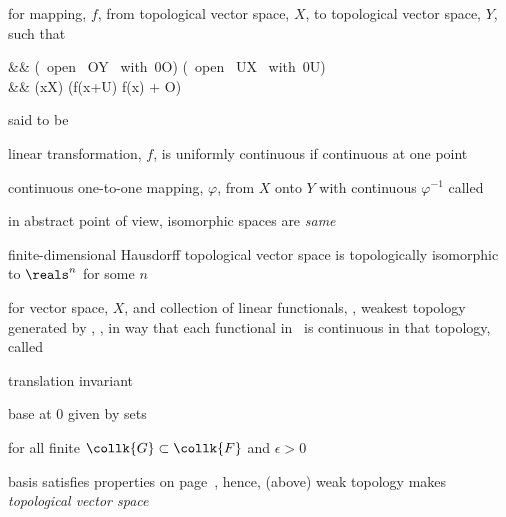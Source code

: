 \documentclass[17pt,landscape]{foils}
\newcommand\collF{\collk{F}}
\begin{document}
{{	\vitem for mapping, $f$,
		from topological vector space, $X$,
		to topological vector space, $Y$,
		such that

		\begin{eqna}
			&&
			(\forall \mbox{ open } O\subset Y \mbox{ with }0\in O)
			(\exists \mbox{ open } U\subset X \mbox{ with }0\in U)
			\\
			&&
			(\forall x\in X)
			(f(x+U) \subset f(x) + O)
		\end{eqna}

		said to be 

	\vitem linear transformation, $f$, is uniformly continuous
		if continuous at one point

	\vitem continuous one-to-one mapping, $\varphi$, from $X$ onto $Y$ with continuous $\varphi^{-1}$
		called 
	\bit
		\item in abstract point of view, isomorphic spaces are \emph{same}
	\eit

	\vitem {}
		finite-dimensional Hausdorff topological vector space
		is topologically isomorphic
		to $\reals^n$ for some $n$%
\eit


%

\bit
	\item for vector space, $X$, and collection of linear functionals, \collF,
		weakest topology generated by \collF,
		\ie, in way that each functional in \collF\ is continuous in that topology,
		called  \collF\
	\bit
		\item translation invariant
		\item base at $0$ given by sets

		\begin{eqn}
		\end{eqn}

		for all finite $\collk{G}\subset\collF$ and $\epsilon>0$

		\item basis satisfies properties on page~\pageref{page:Sufficient-and-necessarily-condition-for-topological-vector-spaces},
			hence, (above) weak topology makes \emph{topological vector space}
	\eit

}}
\end{document}
